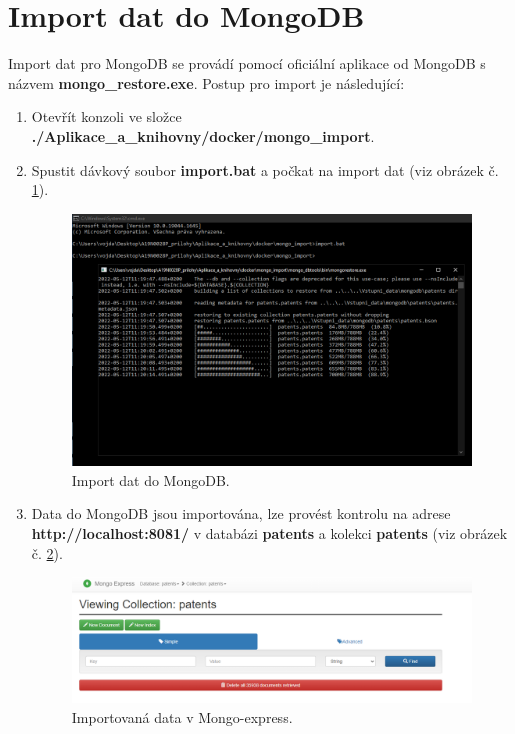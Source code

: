\section{Import dat do MongoDB}
Import dat pro MongoDB se provádí pomocí oficiální aplikace od MongoDB s názvem \textbf{mongo\_restore.exe}. Postup pro import je následující:
\begin{enumerate}
\item Otevřít konzoli ve složce \textbf{./Aplikace\_a\_knihovny/docker/mongo\_import}.
\item Spustit dávkový soubor \textbf{import.bat} a počkat na import dat (viz obrázek č. \ref{fig:mongo_import}).
	\begin{figure}[H]
	\centering
	\includegraphics[width=14cm]{img/manual/mongo_import}
	\caption{Import dat do MongoDB.}
	\label{fig:mongo_import}
	\end{figure}
\item Data do MongoDB jsou importována, lze provést kontrolu na adrese \textbf{http://localhost:8081/} v databázi \textbf{patents} a kolekci \textbf{patents} (viz obrázek č. \ref{fig:mongo_done_import}).
		\begin{figure}[H]
		\centering
		\includegraphics[width=15cm]{img/manual/mongo_import_done}
		\caption{Importovaná data v Mongo-express.}
		\label{fig:mongo_done_import}

\end{figure}
\end{enumerate}
